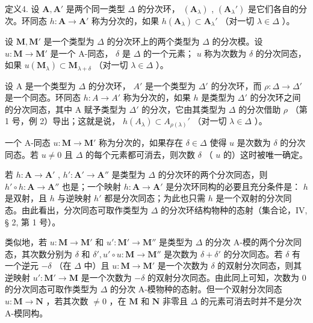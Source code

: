 定义4. 设 \(\mathbf{A}, \mathbf{A}'\) 是两个同一类型 \(\Delta\) 的分次环， \((\mathbf{A}_{\lambda})\) , \((\mathbf{A}_{\lambda}')\) 是它们各自的分次。环同态 \(h: \mathbf{A} \to \mathbf{A}'\) 称为分次的，如果 \(h(\mathbf{A}_{\lambda}) \subset \mathbf{A}_{\lambda}'\) （对一切 \(\lambda \in \Delta\) ）。

设 \(\mathbf{M}, \mathbf{M}'\) 是一个类型为 \(\Delta\) 的分次环上的两个类型为 \(\Delta\) 的分次模。设 \(u: \mathbf{M} \to \mathbf{M}'\) 是一个 A-同态， \(\delta\) 是 \(\Delta\) 的一个元素； \(u\) 称为次数为 \(\delta\) 的分次同态，如果 \(u(\mathbf{M}_{\lambda}) \subset \mathbf{M}_{\lambda + \delta}\) （对一切 \(\lambda \in \Delta\) ）。

设 A 是一个类型为 \(\Delta\) 的分次环， \(A'\) 是一个类型为 \(\Delta'\) 的分次环，而 \(\rho: \Delta \to \Delta'\) 是一个同态。环同态 \(h: A \to A'\) 称为分次的，如果 \(h\) 是类型为 \(\Delta'\) 的分次环之间的分次同态，其中 A 赋予类型为 \(\Delta'\) 的分次，它由其类型为 \(\Delta\) 的分次借助 \(\rho\) （第 1 号，例 2）导出；这就是说， \(h(A_{\lambda}) \subset A_{\rho(\lambda)}'\) （对一切 \(\lambda \in \Delta\) ）。

一个 A-同态 \(u: \mathbf{M} \to \mathbf{M}'\) 称为分次的，如果存在 \(\delta \in \Delta\) 使得 \(u\) 是次数为 \(\delta\) 的分次同态。若 \(u \neq 0\) 且 \(\Delta\) 的每个元素都可消去，则次数 \(\delta\) （ \(u\) 的）这时被唯一确定。

若 \(h: \mathbf{A} \to \mathbf{A}'\) , \(h': \mathbf{A}' \to \mathbf{A}''\) 是类型为 \(\Delta\) 的分次环的两个分次同态，则 \(h' \circ h: \mathbf{A} \to \mathbf{A}''\) 也是；一个映射 \(h: \mathbf{A} \to \mathbf{A}'\) 是分次环同构的必要且充分条件是： \(h\) 是双射，且 \(h\) 与逆映射 \(h'\) 都是分次同态；为此也只需 \(h\) 是一个双射的分次同态。由此看出，分次同态可取作类型为 \(\Delta\) 的分次环结构物种的态射（集合论，IV, § 2, 第 1 号）。

类似地，若 \(u: \mathbf{M} \to \mathbf{M}'\) 和 \(u': \mathbf{M}' \to \mathbf{M}''\) 是类型为 \(\Delta\) 的分次 A-模的两个分次同态，其次数分别为 \(\delta\) 和 \(\delta', u' \circ u: \mathbf{M} \to \mathbf{M}''\) 是次数为 \(\delta + \delta'\) 的分次同态。若 \(\delta\) 有一个逆元 \(-\delta\) （在 \(\Delta\) 中）且 \(u: \mathbf{M} \to \mathbf{M}'\) 是一个次数为 \(\delta\) 的双射分次同态，则其逆映射 \(u': \mathbf{M}' \to \mathbf{M}\) 是一个次数为 \(-\delta\) 的双射分次同态。由此同上可知，次数为 0 的分次同态可取作类型为 \(\Delta\) 的分次 A-模物种的态射。但一个双射分次同态 \(u: \mathbf{M} \to \mathbf{N}\) ，若其次数 \(\neq 0\) ，在 \(\mathbf{M}\) 和 \(\mathbf{N}\) 非零且 \(\Delta\) 的元素可消去时并不是分次 A-模同构。


